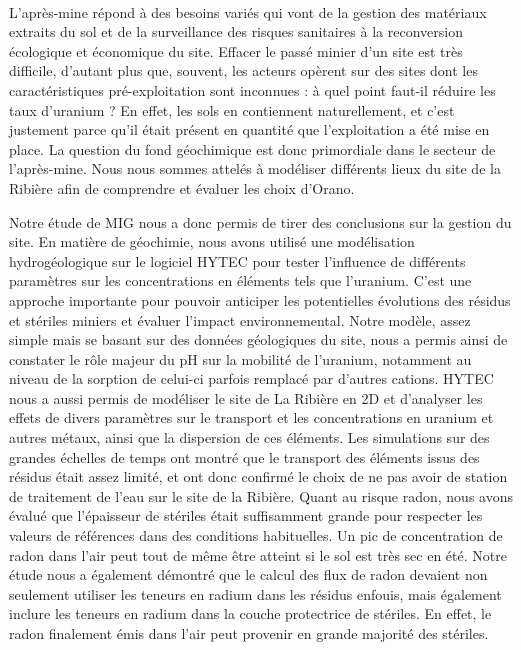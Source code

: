 \documentclass{article}
\begin{document}
\paragraph{} L'après-mine répond à des besoins variés qui vont de la gestion des matériaux extraits du sol et de la surveillance des risques sanitaires à la reconversion écologique et économique du site. Effacer le passé minier d'un site est très difficile, d'autant plus que, souvent, les acteurs opèrent sur des sites dont les caractéristiques pré-exploitation sont inconnues : à quel point faut-il réduire les taux d'uranium ? En effet, les sols en contiennent naturellement, et c'est justement parce qu'il était présent en quantité que l'exploitation a été mise en place. La question du fond géochimique est donc primordiale dans le secteur de l'après-mine. Nous nous sommes attelés à modéliser différents lieux du site de la Ribière afin de comprendre et évaluer les choix d'Orano.

Notre étude de MIG nous a donc permis de tirer des conclusions sur la gestion du site. En matière de géochimie, nous avons utilisé une modélisation hydrogéologique sur le logiciel HYTEC pour tester l'influence de différents paramètres sur les concentrations en éléments tels que l'uranium. C'est une approche importante pour pouvoir anticiper les potentielles évolutions des résidus et stériles miniers et évaluer l'impact environnemental. Notre modèle, assez simple mais se basant sur des données géologiques du site, nous a permis ainsi de constater le rôle majeur du pH sur la mobilité de l'uranium, notamment au niveau de la sorption de celui-ci parfois remplacé par d'autres cations. HYTEC nous a aussi permis de modéliser le site de La Ribière en 2D et d'analyser les effets de divers paramètres sur le transport et les concentrations en uranium et autres métaux, ainsi que la dispersion de ces éléments. Les simulations sur des grandes échelles de temps ont montré que le transport des éléments issus des résidus était assez limité, et ont donc confirmé le choix de ne pas avoir de station de traitement de l'eau sur le site de la Ribière. Quant au risque radon, nous avons évalué que l'épaisseur de stériles était suffisamment grande pour respecter les valeurs de références dans des conditions habituelles. Un pic de concentration de radon dans l'air peut tout de même être atteint si le sol est très sec en été. Notre étude nous a également démontré que le calcul des flux de radon devaient non seulement utiliser les teneurs en radium dans les résidus enfouis, mais également inclure les teneurs en radium dans la couche protectrice de stériles. En effet, le radon finalement émis dans l'air peut provenir en grande majorité des stériles.
\end{document}
